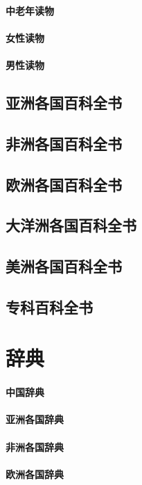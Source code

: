 \documentclass[UTF8]{../ApplicationUniverse}
\begin{document}
        \subsubsection{中老年读物}
        \subsubsection{女性读物}
        \subsubsection{男性读物}
\section{亚洲各国百科全书}
\section{非洲各国百科全书}
\section{欧洲各国百科全书}
\section{大洋洲各国百科全书}
\section{美洲各国百科全书}
\section{专科百科全书}






\chapter{辞典}
\subsubsection{中国辞典}
\subsubsection{亚洲各国辞典}
\subsubsection{非洲各国辞典}
\subsubsection{欧洲各国辞典}
\end{document}
